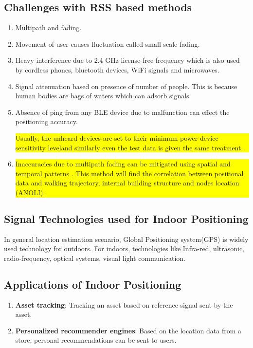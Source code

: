 \subsection{Challenges with  RSS based methods}
 \begin{enumerate}
 \item Multipath and fading. 
 \item Movement of user causes fluctuation called small scale fading\cite{??}.
 \item Heavy interference due to 2.4 GHz license-free frequency which is also used by cordless phones, bluetooth devices, WiFi signals and microwaves. \cite{kamath}
 \item Signal attenuation based on presence of number of people. This is because human bodies are bags of waters which can adsorb signals. \cite{kamath}
 \item Absence of ping from any BLE device due to malfunction can effect the positioning accuracy. \colorbox{yellow}{\parbox{1\textwidth}{Usually, the unheard devices are set to their minimum power device sensitivity level\cite{yiu}and similarly even the test data is given the same treatment.}}
 
 \item  \colorbox{yellow}{\parbox{1\textwidth}{Inaccuracies due to multipath fading can be mitigated using spatial and temporal patterns \cite{he}. This method will find the correlation between positional data and walking trajectory, internal building structure and nodes location (ANOLI).}}
 \end{enumerate}
 

\subsection{Signal Technologies used for Indoor Positioning}
In general location estimation scenario, Global Positioning system(GPS) is widely used technology for outdoors. For indoors, technologies like Infra-red, ultrasonic, radio-frequency, optical systems\cite{umar}, visual light communication.    

\subsection{Applications of Indoor Positioning}


\begin{enumerate}
\item \textbf{Asset tracking}: Tracking an asset based on reference signal sent by the asset.
\item \textbf{Personalized recommender engines}: Based on the location data from a store, personal recommendations can be sent to users. 

\end{enumerate} 


